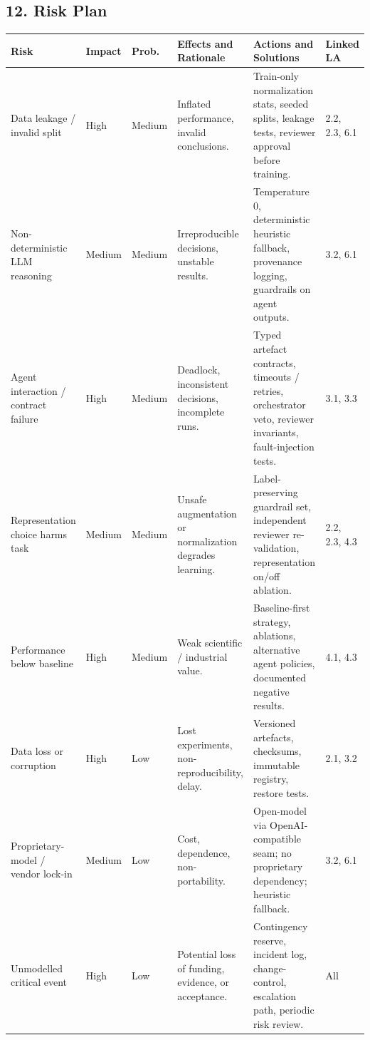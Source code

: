 \documentclass[11pt,a4paper]{article}
\newcommand{\hd}[1]{\cellcolor{hdr}\textbf{#1}}
\begin{document}
\subsection*{12. Risk Plan}
\vspace{2pt}
\noindent
{}
\footnotesize
\begin{tabularx}{\textwidth}{|P{2.4cm}|Y{1.2cm}|Y{1.2cm}|L|L|P{1.5cm}|}
\hline
\hd{Risk} & \hd{Impact} & \hd{Prob.} & \hd{Effects and Rationale} & \hd{Actions and Solutions} & \hd{Linked LA} \\ \hline
Data leakage / invalid split & High & Medium & Inflated performance, invalid conclusions. & Train-only normalization stats, seeded splits, leakage tests, reviewer approval before training. & 2.2, 2.3, 6.1 \\ \hline
Non-deterministic LLM reasoning & Medium & Medium & Irreproducible decisions, unstable results. & Temperature 0, deterministic heuristic fallback, provenance logging, guardrails on agent outputs. & 3.2, 6.1 \\ \hline
Agent interaction / contract failure & High & Medium & Deadlock, inconsistent decisions, incomplete runs. & Typed artefact contracts, timeouts / retries, orchestrator veto, reviewer invariants, fault-injection tests. & 3.1, 3.3 \\ \hline
Representation choice harms task & Medium & Medium & Unsafe augmentation or normalization degrades learning. & Label-preserving guardrail set, independent reviewer re-validation, representation on/off ablation. & 2.2, 2.3, 4.3 \\ \hline
Performance below baseline & High & Medium & Weak scientific / industrial value. & Baseline-first strategy, ablations, alternative agent policies, documented negative results. & 4.1, 4.3 \\ \hline
Data loss or corruption & High & Low & Lost experiments, non-reproducibility, delay. & Versioned artefacts, checksums, immutable registry, restore tests. & 2.1, 3.2 \\ \hline
Proprietary-model / vendor lock-in & Medium & Low & Cost, dependence, non-portability. & Open-model via OpenAI-compatible seam; no proprietary dependency; heuristic fallback. & 3.2, 6.1 \\ \hline
Unmodelled critical event & High & Low & Potential loss of funding, evidence, or acceptance. & Contingency reserve, incident log, change-control, escalation path, periodic risk review. & All \\ \hline
\end{tabularx}
\normalsize
\end{document}
